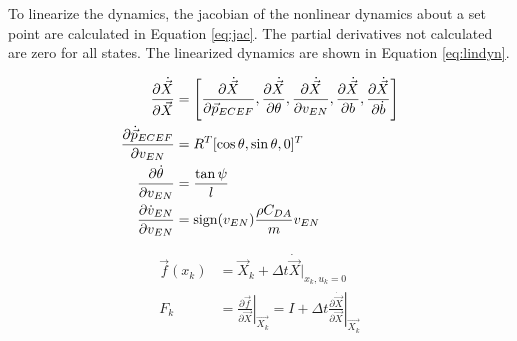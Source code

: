 \documentclass[letterpaper,times]{IONconf}
\begin{document}
To linearize the dynamics, the jacobian of the nonlinear dynamics about a set point are calculated in Equation \eqref{eq:jac}. The partial derivatives not calculated are zero for all states. The linearized dynamics are shown in Equation \eqref{eq:lindyn}.

\begin{equation}
    \begin{aligned}
        \frac{ \partial \dot{\vec{X}}}{\partial \vec{X} } &= 
        \left[ \frac{\partial \dot{\vec{X}}} { \partial {\vec{p}}_{ECEF} }, 
        \frac{\partial \dot{\vec{X}}} { \partial {\theta} },
        \frac{\partial \dot{\vec{X}}} { \partial {v_{EN}} },
        \frac{\partial \dot{\vec{X}}} { \partial {b} },
        \frac{\partial \dot{\vec{X}}} { \partial {\dot{b}} }
        \right]\\
        \frac{ \partial \dot{\vec{p}}_{ECEF} }{\partial v_{EN} } &= R^T [\cos \theta,\sin \theta, 0]^T\\
        \frac{ \partial \dot{\theta } }{\partial v_{EN} } &= \frac{ \tan \psi }{l }\\
        \frac{ \partial \dot{v}_{EN} }{\partial v_{EN} } &= \mathrm{sign}(v_{EN}) \frac{ \rho C_{DA}}{m } v_{EN}
    \end{aligned} \label{eq:jac}
\end{equation}

\begin{equation}
    \begin{aligned}
        \vec{f}(x_k) &= \vec{X}_{k} + \Delta t \dot{\vec{X}}|_{x_k,u_k=0}\\
        F_k &= \left. \frac{ \partial\vec{f}}{\partial \vec{X}}\right\vert_{\vec{X_{k}}} = I + \Delta t \left.\frac{ \partial \dot{\vec{X}}}{\partial \vec{X} }\right\vert_{\vec{X_k}}
    \end{aligned} \label{eq:lindyn}
\end{equation}


\end{document}
